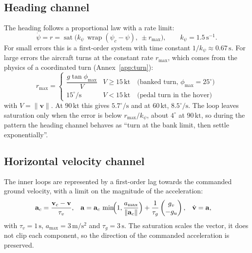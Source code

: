 \documentclass[11pt,a4paper]{article}
\newcommand{\un}[1]{\,\mathrm{#1}}
\newcommand{\wrap}{\operatorname{wrap}}
\newcommand{\sat}{\operatorname{sat}}
\begin{document}
\subsection{Heading channel}

The heading follows a proportional law with a rate limit:
\begin{equation}
\dot\psi = r = \sat\bigl(k_\psi\,\wrap(\psi_c-\psi),\ \pm r_{\max}\bigr),
\qquad k_\psi = 1.5\un{s^{-1}}. \label{eq:heading}
\end{equation}
For small errors this is a first-order system with time constant
$1/k_\psi\approx0.67\un{s}$. For large errors the aircraft turns at the
constant rate $r_{\max}$, which comes from the physics of a coordinated turn
(Annex~\ref{app:turn}):
\begin{equation}
r_{\max} =
\begin{cases}
\dfrac{g\tan\phi_{\max}}{V} & V \ge 15\un{kt} \quad\text{(banked turn, } \phi_{\max}=25^\circ)\\[1.0em]
15^\circ/\mathrm{s} & V < 15\un{kt} \quad\text{(pedal turn in the hover)}
\end{cases} \label{eq:rmax}
\end{equation}
with $V=\lVert\mathbf{v}\rVert$. At $90\un{kt}$ this gives $5.7^\circ/\mathrm{s}$
and at $60\un{kt}$, $8.5^\circ/\mathrm{s}$. The loop leaves saturation only
when the error is below $r_{\max}/k_\psi$, about $4^\circ$ at $90\un{kt}$, so
during the pattern the heading channel behaves as ``turn at the bank limit,
then settle exponentially''.

\subsection{Horizontal velocity channel}

The inner loops are represented by a first-order lag towards the commanded
ground velocity, with a limit on the magnitude of the acceleration:
\begin{align}
\mathbf{a}_c &= \frac{\mathbf{v}_c-\mathbf{v}}{\tau_v}, &
\mathbf{a} &= \mathbf{a}_c\,\min\!\Bigl(1,\frac{a_{\max}}{\lVert\mathbf{a}_c\rVert}\Bigr)
 + \frac{1}{\tau_g}\begin{pmatrix} g_v \\ -g_u \end{pmatrix}, &
\dot{\mathbf{v}} &= \mathbf{a}, \label{eq:vel}
\end{align}
with $\tau_v=1\un{s}$, $a_{\max}=3\un{m/s^2}$ and $\tau_g=3\un{s}$. The
saturation scales the vector, it does not clip each component, so the
direction of the commanded acceleration is preserved.
\end{document}
